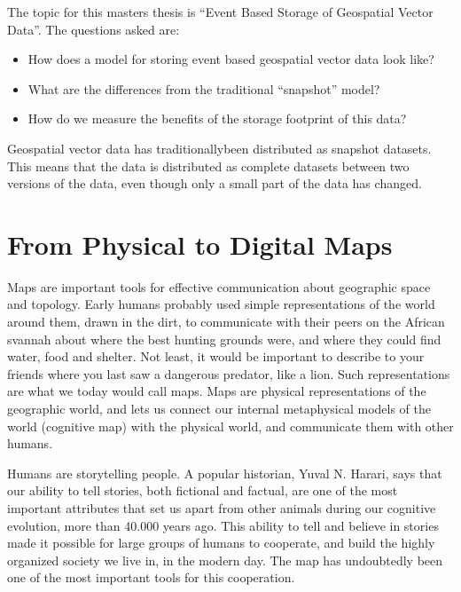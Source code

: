 The topic for this masters thesis is \enquote{Event Based Storage of Geospatial
Vector Data}. The questions asked are:

\begin{itemize}
\item How does a model for storing event based geospatial vector data look
  like?
\item What are the differences from the traditional \enquote{snapshot} model?
\item How do we measure the benefits of the storage footprint of this data?  
\end{itemize}
Geospatial vector data  has traditionallybeen distributed as snapshot datasets. This means
that the data is distributed as complete datasets between two versions of the
data, even though only a small part of the data has changed.



\section{From Physical to Digital Maps}
Maps are important tools for effective communication about geographic space and
topology. Early humans probably used simple representations of the world around
them, drawn in the dirt, to communicate with their peers on the African svannah
about where the best hunting grounds were, and where they could find water, food
and shelter. Not least, it would be important to describe to your friends where
you last saw a dangerous predator, like a lion. Such representations are what we
today would call maps. Maps are physical representations of the
geographic world, and lets us connect our internal metaphysical
models of the world (cognitive map) with the physical world, and communicate
them with other humans.

Humans are storytelling people. A popular historian, Yuval N. Harari, says that
our ability to tell stories, both fictional and factual, are one of the most
important attributes that set us apart from other animals during our cognitive
evolution, more than  40.000 years ago. This ability to tell and
believe in stories made it possible for large groups of humans to cooperate, and
build the highly organized society we live in, in the modern day. The map has
undoubtedly been one of the most important tools for this cooperation.

